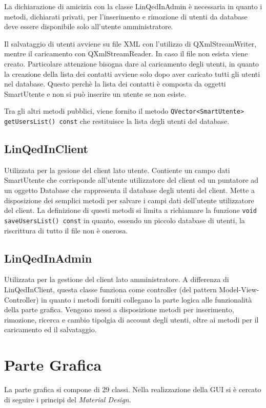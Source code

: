 \documentclass[a4paper]{article}
\begin{document}
La dichiarazione di amicizia con la classe LinQedInAdmin è necessaria in quanto i metodi, dichiarati privati, per l'inserimento e rimozione di utenti da database deve essere disponibile solo all'utente amministratore.

Il salvataggio di utenti avviene su file XML con l'utilizzo di QXmlStreamWriter, mentre il caricamento con QXmlStreamReader. In caso il file non esista viene creato. Particolare attenzione bisogna dare al caricamento degli utenti, in quanto la creazione della lista dei contatti avviene solo dopo aver caricato tutti gli utenti nel database. Questo perchè la lista dei contatti è composta da oggetti SmartUtente e non si può inserire un utente se non esiste.

Tra gli altri metodi pubblici, viene fornito il metodo \texttt{QVector<SmartUtente> getUsersList() const} che restituisce la lista degli utenti del database.

\subsection*{LinQedInClient}
Utilizzata per la gesione del client lato utente. Contiente un campo dati SmartUtente che corrisponde all'utente utilizzatore del client ed un puntatore ad un oggetto Database che rappresenta il database degli utenti del client. Mette a disposizione dei semplici metodi per salvare i campi dati dell'utente utilizzatore del client. La definizione di questi metodi si limita a richiamare la funzione \texttt{void saveUsersList() const} in quanto, essendo un piccolo database di utenti, la riscrittura di tutto il file non è onerosa.

\subsection*{LinQedInAdmin}
Utilizzata per la gestione del client lato amministratore. A differenza di LinQedInClient, questa classe funziona come controller (del pattern Model-View-Controller) in quanto i metodi forniti collegano la parte logica alle funzionalità della parte grafica. Vengono messi a disposizione metodi per inserimento, rimozione, ricerca e cambio tipolgia di account degli utenti, oltre ai metodi per il caricamento ed il salvataggio.

\section*{Parte Grafica}
La parte grafica si compone di 29 classi. Nella realizzazione della GUI si è cercato di seguire i principi del \textit{Material Design}.
\end{document}
